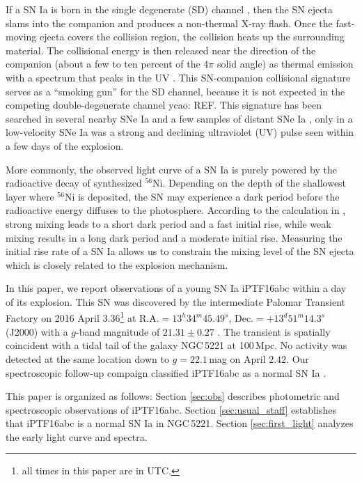 \documentclass[twocolumn]{aastex61}
\newcommand{\ycao}[1]{{\color{red} ycao: {#1}}}
\begin{document}
If a SN Ia is born in the single degenerate (SD) channel
\citep{1973ApJ...186.1007W}, then the SN ejecta slams into the companion and
produces a non-thermal X-ray flash. Once the fast-moving ejecta covers the
collision region, the collision heats up the surrounding material. The
collisional energy is then released near the direction of the companion (about
a few to ten percent of the $4\pi$ solid angle) as thermal emission with a
spectrum that peaks in the UV \citep{2010ApJ...708.1025K}.
This SN-companion collisional
signature serves as a ``smoking gun'' for the SD channel, because it is not
expected in the competing double-degenerate channel \ycao{REF}. This signature
has been searched in several nearby SNe Ia and a few samples of distant
SNe Ia \citep{2010ApJ...722.1691H,2011ApJ...741...20B,2012ApJ...744...38F,
2012ApJ...744L..17B,2015Natur.521..332O,2013ApJ...778L..15Z,
2015ApJ...799..106G,2016ApJ...826..144S,2015ApJS..221...22I}, only in a
low-velocity SNe Ia was a strong and declining ultraviolet (UV) pulse seen
within a few days of the explosion.

More commonly, the observed light curve of a SN Ia is purely
powered by the radioactive decay of synthesized $^{56}$Ni.
Depending on the depth of the shallowest layer where $^{56}$Ni is deposited,
the SN may experience a dark period before the radioactive energy diffuses to
the photosphere. According to the calculation in \citet{2016ApJ...826...96P},
strong mixing leads to a short dark period and a fast initial rise, while
weak mixing results in a long dark period and a moderate initial rise.
Measuring the initial rise rate of a SN Ia allows us to constrain the mixing
level of the SN ejecta which is closely related to the explosion mechanism.

In this paper, we report observations of a young SN Ia iPTF16abc within a day
of its explosion. This SN was discovered by the intermediate Palomar
Transient Factory on 2016 April $3.36$\footnote{all times in this
  paper are in UTC.} at $\textrm{R.A.}=13^h34^m45.49^s$,
$\textrm{Dec.}=+13^d51^m14.3^s$ (J2000) with a $g$-band magnitude of
$21.31\pm0.27$ \citep{2016PASP..128k4502C,2016ATel.8907....1M}. The
transient is spatially coincident with a tidal tail of the galaxy
NGC\,5221 at 100\,Mpc. No activity was detected at the same location
down to $g=22.1$\,mag on April $2.42$. Our spectroscopic follow-up
compaign classified iPTF16abc as a normal SN Ia \citep{2016ATel.8909....1C}.

This paper is organized as follows: Section \ref{sec:obs} describes
photometric and spectroscopic observations of iPTF16abc. Section
\ref{sec:usual_staff} establishes that iPTF16abc is a normal SN Ia
in NGC\,5221. Section \ref{sec:first_light} analyzes the early
light curve and spectra.
\end{document}
